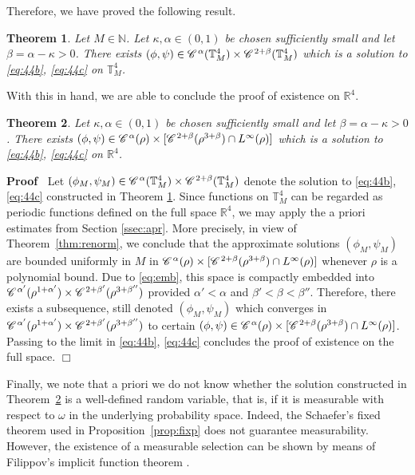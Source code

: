 \documentclass[a4paper,11pt]{article}
\newenvironment{proof}{\noindent\textbf{Proof\ }}{\hspace*{\fill}$\Box$\medskip}
\newtheorem{theorem}{Theorem}[section]
\numberwithin{equation}{section}
\newcommand{\CC}{\mathscr{C} \hspace{.1em}}
\newcommand{\R}{\mathbb{R}}
\newcommand{\8}{\infty}
\begin{document}
Therefore, we have proved the following result.

\begin{theorem}\label{thm:ex-44-per}
Let $M\in\mathbb{N}$. Let $\kappa, \alpha\in (0,1)$ be chosen sufficiently small and let $\beta=\alpha-\kappa>0$.  There exists $(\phi,\psi)\in \CC^{\alpha} (\mathbb{T}_{M}^{4})\times \CC^{2+\beta}(\mathbb{T}_{M}^{4})$ which is a solution to \eqref{eq:44b}, \eqref{eq:44c} on $\mathbb{T}_{M}^{4}$.
\end{theorem}

With this in hand, we are able to conclude the proof of existence on $\R^{4}$.

\begin{theorem}\label{thm:ex43aaa}
Let $\kappa, \alpha\in (0,1)$ be chosen sufficiently small and let $\beta=\alpha-\kappa>0$. There exists $ (\phi,\psi)\in \CC^{\alpha}(\rho)\times[\CC^{2+\beta}(\rho^{3+\beta})\cap L^{\infty}(\rho)]$  which is a solution to \eqref{eq:44b}, \eqref{eq:44c} on $\R^{4}$.
\end{theorem}

\begin{proof}
Let  $(\phi_{M},\psi_{M})\in \CC^{\alpha}(\mathbb{T}^{4}_{M})\times\CC^{2+\beta}(\mathbb{T}^{4}_{M})$ denote the solution to \eqref{eq:44b}, \eqref{eq:44c}  constructed in Theorem \ref{thm:ex-44-per}.
Since functions on $\mathbb{T}^{4}_{M}$ can be regarded as periodic functions defined on the full space $\R^{4}$, we may apply the a priori estimates from Section \ref{ssec:apr}. More precisely, in view of Theorem~\ref{thm:renorm}, we conclude that the approximate solutions $(\phi_{M},\psi_{M})$ are bounded uniformly in $M$ in $ \CC^{\alpha}(\rho)\times[\CC^{2+\beta}(\rho^{3+\beta})\cap L^{\infty}(\rho)]$ whenever $\rho$ is a polynomial bound. Due to \eqref{eq:emb}, this space is compactly embedded into $\CC^{\alpha'}(\rho^{1+\alpha'})\times\CC^{2+\beta'}(\rho^{3+\beta''})$ provided $\alpha'<\alpha$ and $\beta'<\beta<\beta''$. Therefore, there exists a subsequence, still denoted $(\phi_{M},\psi_{M})$ which converges in $\CC^{\alpha'}(\rho^{1+\alpha'})\times\CC^{2+\beta'}(\rho^{3+\beta''})$ to certain $(\phi,\psi)\in  \CC^{\alpha}(\rho)\times[\CC^{2+\beta}(\rho^{3+\beta})\cap L^{\infty}(\rho)]$. Passing to the limit in  \eqref{eq:44b}, \eqref{eq:44c} concludes the proof of existence on the full space.
\end{proof}


Finally, we note that a priori we do not know whether the solution constructed in Theorem~\ref{thm:ex43aaa} is a well-defined random variable, that is, if it is measurable with respect to $\omega$ in the underlying probability space. Indeed, the Schaefer's fixed theorem used in Proposition~\ref{prop:fixp} does not guarantee measurability. However, the existence of a measurable selection can be shown by means of Filippov's implicit function theorem \cite[Theorem 18.17]{AB06}.
\end{document}
